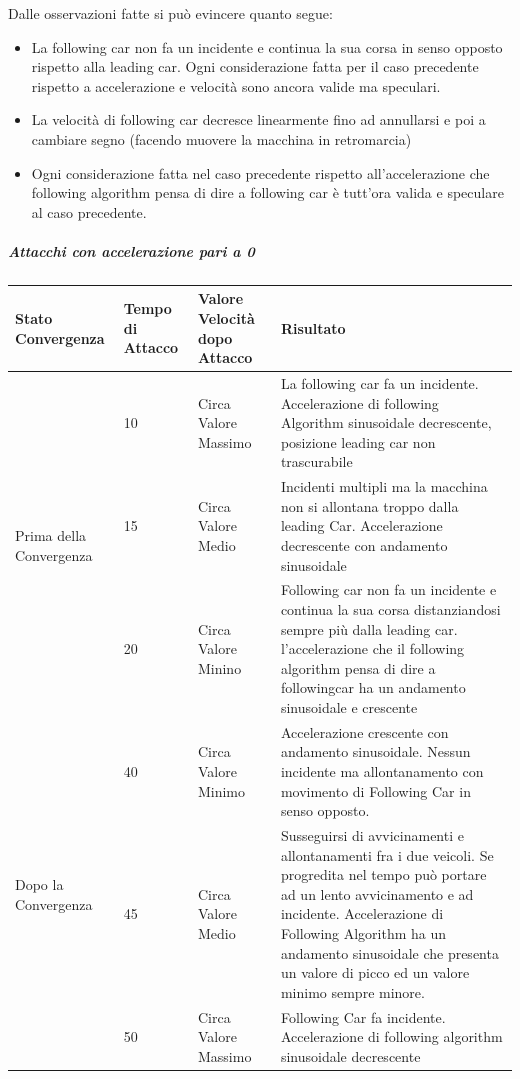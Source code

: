 Dalle osservazioni fatte si può evincere quanto segue:
\begin{itemize}
	\item La following car non fa un incidente e continua la sua corsa in senso opposto rispetto alla leading car. Ogni considerazione fatta per il caso precedente rispetto a accelerazione e velocità sono ancora valide ma speculari.
	\item La velocità di following car decresce linearmente fino ad annullarsi e poi a cambiare segno (facendo muovere la macchina in retromarcia)
	\item Ogni considerazione fatta nel caso precedente rispetto all'accelerazione che following algorithm pensa di dire a following  car è tutt'ora valida e speculare al caso precedente.
\end{itemize}

\subparagraph{Attacchi con accelerazione pari a 0}

\begin{center}
	\begin{tabular}{ |p{4cm}|p{3cm}|p{4cm}|p{8cm}|  }
		\hline
		Stato Convergenza & Tempo di Attacco & Valore Velocità dopo Attacco& Risultato \\
		\hline
		\multirow{3}{4em}{Prima della Convergenza} & 10 & Circa Valore Massimo & La following car fa un incidente. Accelerazione di following Algorithm sinusoidale decrescente, posizione leading car non trascurabile \\
		& 15 & Circa Valore Medio & Incidenti multipli ma la macchina non si allontana troppo dalla leading Car. Accelerazione decrescente con andamento sinusoidale \\
		& 20 & Circa Valore Minino & Following car non fa un incidente e continua la sua corsa distanziandosi sempre più dalla leading car. l'accelerazione che il following algorithm pensa di dire a followingcar ha un andamento sinusoidale e crescente \\
		\hline
		\multirow{3}{4em}{Dopo la Convergenza} & 40 & Circa Valore Minimo & Accelerazione crescente con andamento sinusoidale. Nessun incidente ma allontanamento con movimento di Following Car in senso opposto.\\
		& 45 & Circa Valore Medio & Susseguirsi di avvicinamenti e allontanamenti fra i due veicoli. Se progredita nel tempo può portare ad un lento avvicinamento e ad incidente. Accelerazione di Following Algorithm ha un andamento sinusoidale che presenta un valore di picco ed un valore minimo sempre minore.\\
		& 50 & Circa Valore Massimo & Following Car fa incidente. Accelerazione di following algorithm sinusoidale decrescente \\
		\hline
	\end{tabular}
\end{center}

